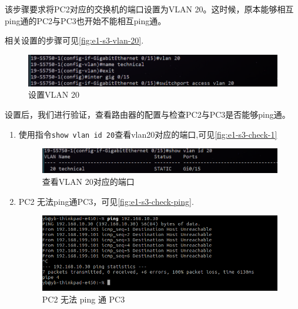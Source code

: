 \documentclass{myreport}
\begin{document}
该步骤要求将PC2对应的交换机的端口设置为VLAN 20。这时候，原本能够相互ping通的PC2与PC3也开始不能相互ping通。

相关设置的步骤可见\autoref{fig:e1-s3-vlan-20}.

\begin{figure}[!htp]
    \centering
    \includegraphics[width=13cm]{"./figure/2018-05-04-09-18-39.png"}
    \caption{设置VLAN 20}
    \label{fig:e1-s3-vlan-20}
\end{figure}

设置后，我们进行验证，查看路由器的配置与检查PC2与PC3是否能够ping通。

\begin{enumerate}
    \item 使用指令\texttt{show vlan id 20}查看vlan20对应的端口,可见\autoref{fig:e1-s3-check-1}
    \begin{figure}[!htp]
        \centering
        \includegraphics[width=13cm]{"./figure/2018-05-04-09-18-49.png"}
        \caption{查看VLAN 20对应的端口}
        \label{fig:e1-s3-check-1}
    \end{figure}
    \item PC2 无法ping通PC3，可见\autoref{fig:e1-s3-check-ping}.
    \begin{figure}[!htp]
        \centering
        \includegraphics[width=13cm]{"./figure/id002.png"}
        \caption{PC2 无法 ping 通 PC3}
        \label{fig:e1-s3-check-ping}
    \end{figure}
\end{enumerate}
\end{document}
